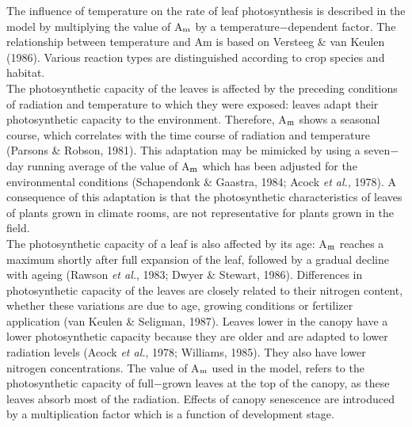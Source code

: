 The influence of temperature on the rate of leaf photosynthesis is described in the model
by multiplying the value of A$_{{\rm m}}$ by a temperature$-$dependent factor. The relationship
between temperature and Am is based on Versteeg \& van Keulen (1986). Various
reaction types are distinguished according to crop species and habitat.  \\
The photosynthetic capacity of the leaves is affected by the preceding conditions of
radiation and temperature to which they were exposed: leaves adapt their photosyn\-thetic
capacity to the environment. Therefore, A$_{{\rm m}}$ shows a seasonal course, which correlates
with the time course of radiation and temperature (Parsons \& Robson, 1981). This
adaptation may be mimicked by using a seven$-$day running average of the value of A$_{{\rm m}}$
which has been adjusted for the environmental conditions (Schapendonk \& Gaastra, 1984;
Acock {\it et al.\/}, 1978). A consequence of this adaptation is that the photosynthetic character\-istics of leaves of plants grown in climate rooms, are not representative for plants grown
in the field.   \\
The photosynthetic capacity of a leaf is also affected by its age: A$_{{\rm m}}$ reaches a maximum
shortly after full expansion of the leaf, followed by a gradual decline with ageing
(Rawson {\it et al.\/}, 1983; Dwyer \& Stewart, 1986). Differences in photosynthetic capacity of
the leaves are closely related to their nitrogen content, whether these variations are due to
age, growing conditions or fertilizer application (van Keulen \& Seligman, 1987). Leaves
lower in the canopy have a lower {\nobreak}photosynthetic capacity because they are older and are
adapted to lower radiation levels (Acock {\it et al.\/}, 1978; Williams, 1985). They also have
lower nitrogen concentrations. The value of A$_{{\rm m}}$ used in the model, refers to the
{\nobreak}photosynthetic capacity of full$-$grown leaves at the top of the canopy, as these leaves
absorb most of the radiation. Effects of canopy senes\-cence are introduced by a multiplica\-tion factor which is a function of development stage.

